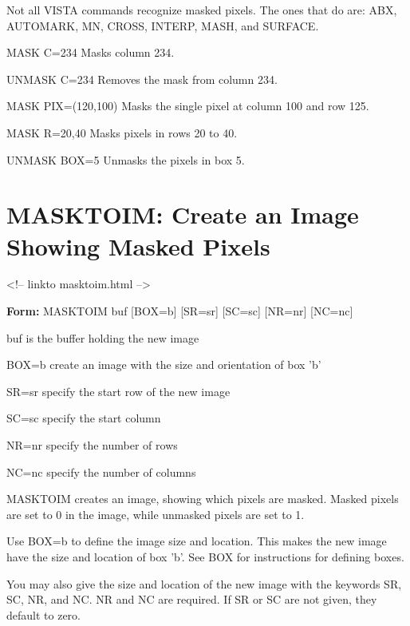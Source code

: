 Not all VISTA commands recognize masked pixels.  The ones that do are: ABX,
AUTOMARK, MN, CROSS, INTERP, MASH, and SURFACE.

\begin{example}
  \item[MASK C=234\hfill]{Masks column 234.}
  \item[UNMASK C=234\hfill]{Removes the mask from column 234.}
  \item[MASK PIX=(120,100)\hfill]{Masks the single pixel at
column 100 and row 125.}
  \item[MASK R=20,40\hfill]{Masks pixels in rows 20 to 40.}
  \item[UNMASK BOX=5\hfill]{Unmasks the pixels in box 5.}
\end{example}

\section{MASKTOIM: Create an Image Showing Masked Pixels}
\begin{rawhtml}
<!-- linkto masktoim.html -->
\end{rawhtml}
\begin{command}
  \item[\textbf{Form:}  MASKTOIM buf {[BOX=b]} {[SR=sr]} {[SC=sc]} {[NR=nr]} {[NC=nc]}\hfill]{}
  \item[buf]{is the buffer holding the new image}
  \item[BOX=b]{create an image with the size and orientation of box 'b'}
  \item[SR=sr]{specify the start row of the new image}
  \item[SC=sc]{specify the start column}
  \item[NR=nr]{specify the number of rows}
  \item[NC=nc]{specify the number of columns}
\end{command}

MASKTOIM creates an image, showing which pixels are masked.  Masked pixels
are set to 0 in the image, while unmasked pixels are set to 1.

Use BOX=b to define the image size and location.  This makes the new image
have the size and location of box 'b'.  See BOX for instructions for
defining boxes.

You may also give the size and location of the new image with the keywords
SR, SC, NR, and NC.  NR and NC are required.  If SR or SC are not given,
they default to zero.

